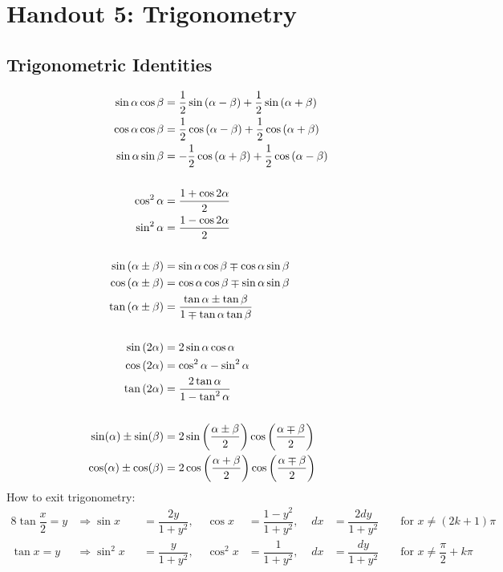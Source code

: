 \section{Handout 5: Trigonometry}

\subsection{Trigonometric Identities}

\begin{align*}
    \sin\alpha\cos\beta &= \dfrac{1}{2}\sin{(\alpha-\beta)} + \dfrac{1}{2}\sin{(\alpha+\beta)} \\
    \cos\alpha\cos\beta &= \dfrac{1}{2}\cos{(\alpha-\beta)} + \dfrac{1}{2}\cos{(\alpha+\beta)} \\
    \sin\alpha\sin\beta &= -\dfrac{1}{2}\cos{(\alpha+\beta)} + \dfrac{1}{2}\cos{(\alpha-\beta)} \\
    \vspace{.25in}\\
    \cos^2\alpha &= \dfrac{1+\cos{2\alpha}}{2} \\
    \sin^2\alpha &= \dfrac{1-\cos{2\alpha}}{2} \\
    \vspace{.25in}\\
    \sin{(\alpha \pm \beta)} &= \sin\alpha\cos\beta \mp \cos\alpha\sin\beta \\
    \cos{(\alpha \pm \beta)} &= \cos\alpha\cos\beta \mp \sin\alpha\sin\beta \\
    \tan{(\alpha \pm \beta)} &= \dfrac{\tan\alpha \pm \tan\beta}{1 \mp \tan\alpha\tan\beta}\\
    \vspace{.25in}\\
    \sin{(2\alpha)} &= 2\sin\alpha\cos\alpha \\
    \cos{(2\alpha)} &= \cos^2\alpha - \sin^2\alpha \\
    \tan{(2\alpha)} &= \dfrac{2\tan\alpha}{1-\tan^2\alpha}\\
    \vspace{.25in}\\
    \sin(\alpha) \pm \sin(\beta) &= 2\sin\left(\dfrac{\alpha \pm \beta}{2}\right)\cos\left(\dfrac{\alpha \mp \beta}{2}\right) \\
    \cos(\alpha) \pm \cos(\beta) &= 2\cos\left(\dfrac{\alpha + \beta}{2}\right)\cos\left(\dfrac{\alpha \mp \beta}{2}\right) \\
\end{align*}
How to exit trigonometry:
\begin{alignat*}{8}
    \tan{\dfrac{x}{2}} = y &\Rightarrow \sin x &&= \dfrac{2y}{1+y^2}, &\cos x &= \dfrac{1-y^2}{1+y^2}, & dx &= \dfrac{2dy}{1+y^2} &&\text{ for } x \neq (2k+1)\pi\\
    \tan x = y &\Rightarrow \sin^2 x &&= \dfrac{y}{1+y^2},\,\, &\cos^2 x &= \dfrac{1}{1+y^2},\,\, & dx &= \dfrac{dy}{1+y^2} &&\text{ for } x \neq \dfrac{\pi}{2} + k\pi\\
\end{alignat*}
\pagebreak
